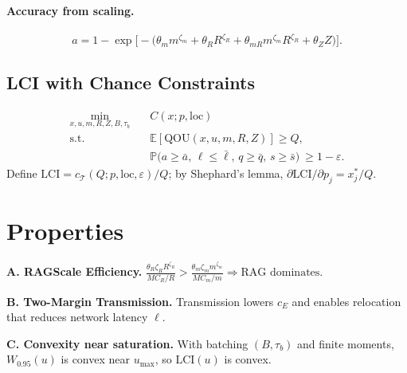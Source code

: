 ﻿\documentclass[12pt]{article}
\numberwithin{equation}{section}
\newcommand{\QOU}{\mathrm{QOU}}
\newcommand{\LCI}{\mathrm{LCI}}
\newcommand{\E}{\mathbb{E}}
\newcommand{\Prb}{\mathbb{P}}
\newcommand{\elloc}{\mathrm{loc}}
\begin{document}
\paragraph{Accuracy from scaling.}
\begin{equation}
a = 1 - \exp\!\Big[-\big(\theta_m m^{\zeta_m} + \theta_R R^{\zeta_R} + \theta_{mR} m^{\zeta_m}R^{\zeta_R} + \theta_Z Z\big)\Big].
\end{equation}

\subsection{LCI with Chance Constraints}
\begin{equation}\label{eq:program}
\begin{aligned}
\min_{x,u,m,R,Z,B,\tau_b} \quad & C(x;p,\elloc)\\
\text{s.t.}\quad & \E[\QOU(x,u,m,R,Z)] \ge Q,\\
& \Prb\!\big(a\ge \bar a,\, \ell\le \bar \ell,\, q\ge \bar q,\, s\ge \bar s\big)\ \ge 1-\varepsilon.
\end{aligned}
\end{equation}
Define $\LCI = c_{\mathcal T}(Q;p,\elloc,\varepsilon)/Q$; by Shephard's lemma, $\partial \LCI/\partial p_j=x_j^*/Q$.

\section{Properties}
\textbf{A. RAGScale Efficiency.}\;
\(
\frac{\theta_R \zeta_R R^{\zeta_R}}{MC_R/R} >
\frac{\theta_m \zeta_m m^{\zeta_m}}{MC_m/m}
\Rightarrow \text{RAG dominates.}
\)

\textbf{B. Two-Margin Transmission.}\; Transmission lowers $c_E$ and enables relocation that reduces network latency $\ell$.

\textbf{C. Convexity near saturation.}\; With batching $(B,\tau_b)$ and finite moments, $W_{0.95}(u)$ is convex near $u_{\max}$, so $\LCI(u)$ is convex.

\end{document}
